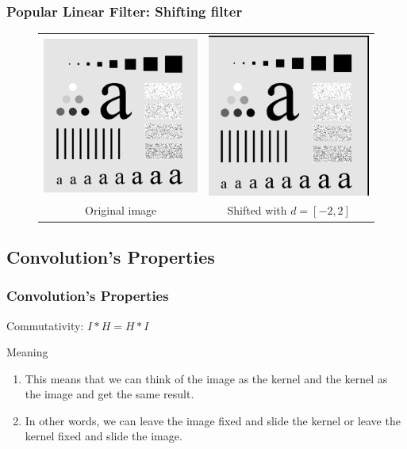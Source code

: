 \documentclass[english,11pt,table,handout]{beamer}
\begin{document}
\frame
{
	\frametitle{Popular Linear Filter: Shifting filter}
	\begin{figure}
		\begin{tabular}{cc}
			\includegraphics[scale=0.53]{char.png} &
			\includegraphics[scale=0.53]{char_shifted_2_2.png} \\
			Original image & Shifted with $d=[-2, 2]$ 
		\end{tabular}
	\end{figure}
}

\subsection{Convolution's Properties}
\frame
{
	\frametitle{Convolution's Properties}
	\begin{block}{Commutativity:}
		\centering
		$I * H = H * I$
	\end{block}
	\begin{alertblock}{Meaning}
		\begin{enumerate}
			\item This means that we can think of the image as the kernel and the kernel as the image and get the same result. 
			
			\item In other words, we can leave the image fixed and slide the kernel or leave the kernel fixed and slide the image.
		\end{enumerate}		
		
	\end{alertblock}
}
\end{document}
